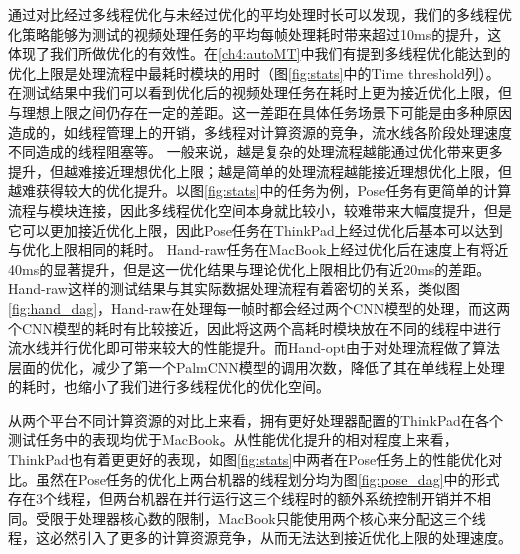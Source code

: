 通过对比经过多线程优化与未经过优化的平均处理时长可以发现，我们的多线程优化策略能够为测试的视频处理任务的平均每帧处理耗时带来超过10ms的提升，这体现了我们所做优化的有效性。在\ref{ch4:autoMT}中我们有提到多线程优化能达到的优化上限是处理流程中最耗时模块的用时（图\ref{fig:stats}中的Time threshold列）。在测试结果中我们可以看到优化后的视频处理任务在耗时上更为接近优化上限，但与理想上限之间仍存在一定的差距。这一差距在具体任务场景下可能是由多种原因造成的，如线程管理上的开销，多线程对计算资源的竞争，流水线各阶段处理速度不同造成的线程阻塞等。
一般来说，越是复杂的处理流程越能通过优化带来更多提升，但越难接近理想优化上限；越是简单的处理流程越能接近理想优化上限，但越难获得较大的优化提升。以图\ref{fig:stats}中的任务为例，Pose任务有更简单的计算流程与模块连接，因此多线程优化空间本身就比较小，较难带来大幅度提升，但是它可以更加接近优化上限，因此Pose任务在ThinkPad上经过优化后基本可以达到与优化上限相同的耗时。
Hand-raw任务在MacBook上经过优化后在速度上有将近40ms的显著提升，但是这一优化结果与理论优化上限相比仍有近20ms的差距。Hand-raw这样的测试结果与其实际数据处理流程有着密切的关系，类似图\ref{fig:hand_dag}，Hand-raw在处理每一帧时都会经过两个CNN模型的处理，而这两个CNN模型的耗时有比较接近，因此将这两个高耗时模块放在不同的线程中进行流水线并行优化即可带来较大的性能提升。而Hand-opt由于对处理流程做了算法层面的优化，减少了第一个PalmCNN模型的调用次数，降低了其在单线程上处理的耗时，也缩小了我们进行多线程优化的优化空间。\par

从两个平台不同计算资源的对比上来看，拥有更好处理器配置的ThinkPad在各个测试任务中的表现均优于MacBook。从性能优化提升的相对程度上来看，ThinkPad也有着更更好的表现，如图\ref{fig:stats}中两者在Pose任务上的性能优化对比。虽然在Pose任务的优化上两台机器的线程划分均为图\ref{fig:pose_dag}中的形式存在3个线程，但两台机器在并行运行这三个线程时的额外系统控制开销并不相同。受限于处理器核心数的限制，MacBook只能使用两个核心来分配这三个线程，这必然引入了更多的计算资源竞争，从而无法达到接近优化上限的处理速度。


